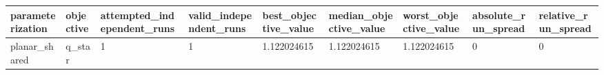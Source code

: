 \begin{tabular}{@{}lllllllll@{}}
\toprule
parameterization & objective & attempted\_independent\_runs & valid\_independent\_runs & best\_objective\_value & median\_objective\_value & worst\_objective\_value & absolute\_run\_spread & relative\_run\_spread \\
\midrule
planar\_shared & q\_star & 1 & 1 & 1.122024615 & 1.122024615 & 1.122024615 & 0 & 0 \\
\bottomrule
\end{tabular}
